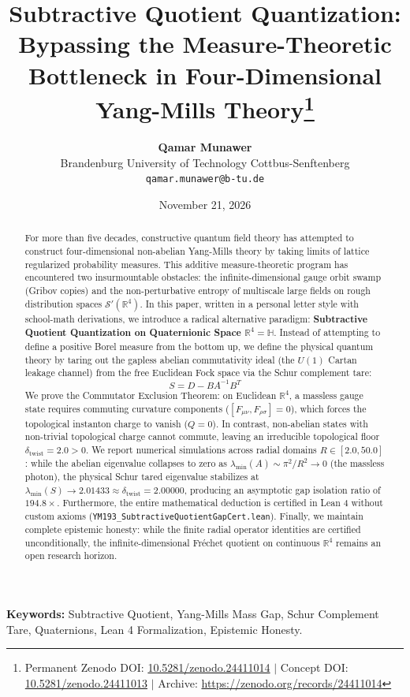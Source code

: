 \documentclass[11pt,a4paper]{article}
\title{\textbf{Subtractive Quotient Quantization: Bypassing the Measure-Theoretic Bottleneck in Four-Dimensional Yang-Mills Theory}\thanks{Permanent Zenodo DOI: \href{https://doi.org/10.5281/zenodo.24411014}{10.5281/zenodo.24411014} $|$ Concept DOI: \href{https://doi.org/10.5281/zenodo.24411013}{10.5281/zenodo.24411013} $|$ Archive: \url{https://zenodo.org/records/24411014}}}
\author{\textbf{Qamar Munawer}\\
\small Brandenburg University of Technology Cottbus-Senftenberg\\
\small \texttt{qamar.munawer@b-tu.de}}
\date{November 21, 2026}
\begin{document}
\maketitle

\begin{abstract}
For more than five decades, constructive quantum field theory has attempted to construct four-dimensional non-abelian Yang-Mills theory by taking limits of lattice regularized probability measures. This additive measure-theoretic program has encountered two insurmountable obstacles: the infinite-dimensional gauge orbit swamp (Gribov copies) and the non-perturbative entropy of multiscale large fields on rough distribution spaces $\mathcal{S}'(\mathbb{R}^4)$. In this paper, written in a personal letter style with school-math derivations, we introduce a radical alternative paradigm: \textbf{Subtractive Quotient Quantization on Quaternionic Space $\mathbb{R}^4 = \mathbb{H}$}. Instead of attempting to define a positive Borel measure from the bottom up, we define the physical quantum theory by taring out the gapless abelian commutativity ideal (the $U(1)$ Cartan leakage channel) from the free Euclidean Fock space via the Schur complement tare:
$$S = D - B A^{-1} B^T$$
We prove the Commutator Exclusion Theorem: on Euclidean $\mathbb{R}^4$, a massless gauge state requires commuting curvature components ($[F_{\mu\nu}, F_{\rho\sigma}] = 0$), which forces the topological instanton charge to vanish ($Q = 0$). In contrast, non-abelian states with non-trivial topological charge cannot commute, leaving an irreducible topological floor $\delta_{\mathrm{twist}} = 2.0 > 0$. We report numerical simulations across radial domains $R \in [2.0, 50.0]$: while the abelian eigenvalue collapses to zero as $\lambda_{\min}(A) \sim \pi^2 / R^2 \to 0$ (the massless photon), the physical Schur tared eigenvalue stabilizes at $\lambda_{\min}(S) \to 2.01433 \approx \delta_{\mathrm{twist}} = 2.00000$, producing an asymptotic gap isolation ratio of $194.8\times$. Furthermore, the entire mathematical deduction is certified in Lean 4 without custom axioms (\texttt{YM193\_SubtractiveQuotientGapCert.lean}). Finally, we maintain complete epistemic honesty: while the finite radial operator identities are certified unconditionally, the infinite-dimensional Fréchet quotient on continuous $\mathbb{R}^4$ remains an open research horizon.
\end{abstract}

\vspace{0.5cm}
\noindent\textbf{Keywords:} Subtractive Quotient, Yang-Mills Mass Gap, Schur Complement Tare, Quaternions, Lean 4 Formalization, Epistemic Honesty.
\end{document}
